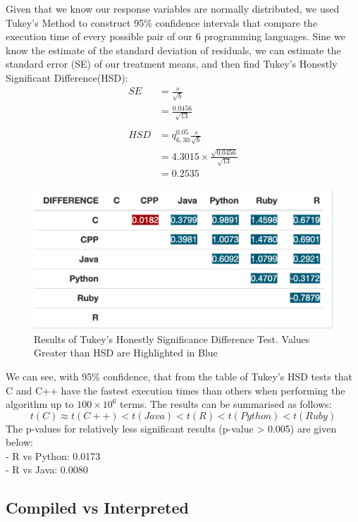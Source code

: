 \documentclass[12pt,halfline,a4paper,]{ouparticle}
\begin{document}
Given that we know our response variables are normally distributed, we
used Tukey's Method to construct 95\% confidence intervals that compare
the execution time of every possible pair of our 6 programming
languages. Sine we know the estimate of the standard deviation of
residuals, we can estimate the standard error (SE) of our treatment
means, and then find Tukey's Honestly Significant Difference(HSD): \[
\begin{aligned}
SE &= \frac{s}{\sqrt{b}}\\
&= \frac{0.0456}{\sqrt{13}}\\\\
HSD &= q_{6,30}^{0.05} \frac{s}{\sqrt{b}}\\
&= 4.3015 \times \frac{\sqrt{0.0456}}{\sqrt{13}}\\
&= 0.2535
\end{aligned}
\]

\begin{figure}[H]
\includegraphics[width=1\linewidth]{skeleton_files/table_tukey} \caption{Results of Tukey's Honestly Significance Difference Test. Values Greater than HSD are Highlighted in Blue}\label{fig:tableTukey}
\end{figure}

We can see, with 95\% confidence, that from the table of Tukey's HSD
tests that C and C++ have the fastest execution times than others when
performing the algorithm up to \(100 \times 10^6\) terms. The results
can be summarised as follows: \[
t(C) \approx t(C++) < t(Java) < t(R) < t(Python) < t(Ruby)
\] The p-values for relatively less significant results (p-value
\textgreater{} 0.005) are given below:\\
- R vs Python: 0.0173\\
- R vs Java: 0.0080

\subsection{Compiled vs Interpreted}\label{compiled-vs-interpreted}
\end{document}
